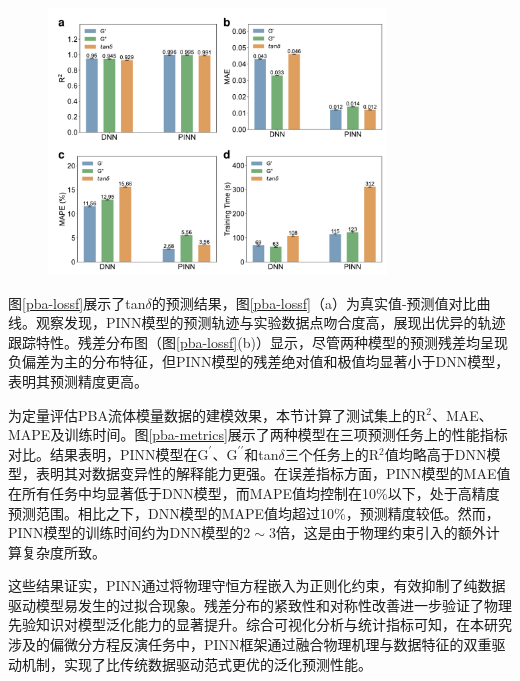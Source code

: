 \begin{figure}[htbp]
  \centering
  \includegraphics[width=0.8\textwidth]{Fig/pba-metrics.pdf}
\end{figure}
图\ref{pba-lossf}展示了tan$\delta$的预测结果，图\ref{pba-lossf}（a）为真实值-预测值对比曲线。观察发现，PINN模型的预测轨迹与实验数据点吻合度高，展现出优异的轨迹跟踪特性。残差分布图（图\ref{pba-lossf}(b)）显示，尽管两种模型的预测残差均呈现负偏差为主的分布特征，但PINN模型的残差绝对值和极值均显著小于DNN模型，表明其预测精度更高。

为定量评估PBA流体模量数据的建模效果，本节计算了测试集上的R$^2$、MAE、MAPE及训练时间。图\ref{pba-metrics}展示了两种模型在三项预测任务上的性能指标对比。结果表明，PINN模型在$\mathrm{G^{\prime}}$、$\mathrm{G^{\prime\prime}}$和tan$\delta$三个任务上的R$^2$值均略高于DNN模型，表明其对数据变异性的解释能力更强。在误差指标方面，PINN模型的MAE值在所有任务中均显著低于DNN模型，而MAPE值均控制在10\%以下，处于高精度预测范围。相比之下，DNN模型的MAPE值均超过10\%，预测精度较低。然而，PINN模型的训练时间约为DNN模型的$2\sim3$倍，这是由于物理约束引入的额外计算复杂度所致。

这些结果证实，PINN通过将物理守恒方程嵌入为正则化约束，有效抑制了纯数据驱动模型易发生的过拟合现象。残差分布的紧致性和对称性改善进一步验证了物理先验知识对模型泛化能力的显著提升。综合可视化分析与统计指标可知，在本研究涉及的偏微分方程反演任务中，PINN框架通过融合物理机理与数据特征的双重驱动机制，实现了比传统数据驱动范式更优的泛化预测性能。
